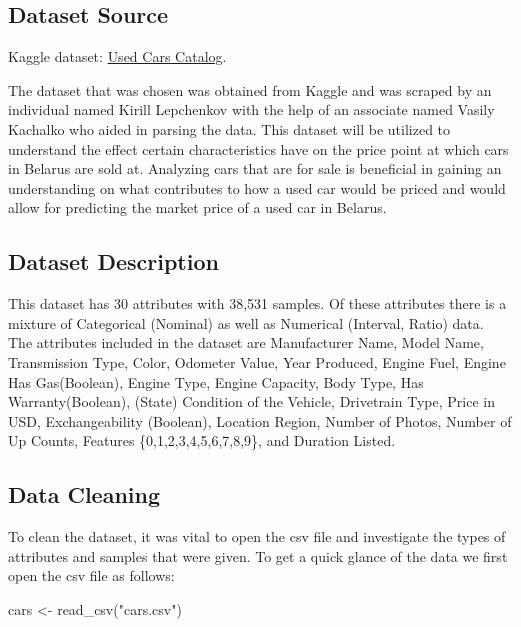 \documentclass[
]{article}
\newenvironment{Shaded}{\begin{snugshade}}{\end{snugshade}}
\newcommand{\FunctionTok}[1]{\textcolor[rgb]{0.00,0.00,0.00}{#1}}
\newcommand{\NormalTok}[1]{#1}
\newcommand{\OtherTok}[1]{\textcolor[rgb]{0.56,0.35,0.01}{#1}}
\newcommand{\StringTok}[1]{\textcolor[rgb]{0.31,0.60,0.02}{#1}}
\begin{document}
\hypertarget{dataset-source}{%
\subsection{Dataset Source}\label{dataset-source}}

Kaggle dataset:
\href{https://www.kaggle.com/lepchenkov/usedcarscatalog}{Used Cars
Catalog}.

The dataset that was chosen was obtained from Kaggle and was scraped by
an individual named Kirill Lepchenkov with the help of an associate
named Vasily Kachalko who aided in parsing the data. This dataset will
be utilized to understand the effect certain characteristics have on the
price point at which cars in Belarus are sold at. Analyzing cars that
are for sale is beneficial in gaining an understanding on what
contributes to how a used car would be priced and would allow for
predicting the market price of a used car in Belarus.

\hypertarget{dataset-description}{%
\subsection{Dataset Description}\label{dataset-description}}

This dataset has 30 attributes with 38,531 samples. Of these attributes
there is a mixture of Categorical (Nominal) as well as Numerical
(Interval, Ratio) data. The attributes included in the dataset are
Manufacturer Name, Model Name, Transmission Type, Color, Odometer Value,
Year Produced, Engine Fuel, Engine Has Gas(Boolean), Engine Type, Engine
Capacity, Body Type, Has Warranty(Boolean), (State) Condition of the
Vehicle, Drivetrain Type, Price in USD, Exchangeability (Boolean),
Location Region, Number of Photos, Number of Up Counts, Features
\{0,1,2,3,4,5,6,7,8,9\}, and Duration Listed.

\hypertarget{data-cleaning}{%
\subsection{Data Cleaning}\label{data-cleaning}}

To clean the dataset, it was vital to open the csv file and investigate
the types of attributes and samples that were given. To get a quick
glance of the data we first open the csv file as follows:

\begin{Shaded}
\begin{Highlighting}[]
\NormalTok{cars }\OtherTok{\textless{}{-}} \FunctionTok{read\_csv}\NormalTok{(}\StringTok{"cars.csv"}\NormalTok{)}
\end{Highlighting}
\end{Shaded}
\end{document}
